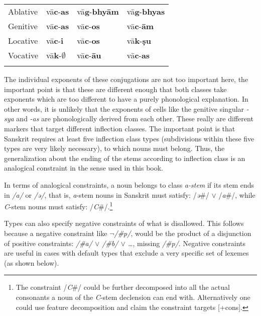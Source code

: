 \begin{table}
\begin{tabular}{llll}
      Ablative     & vā\textbf{c}-\textbf{as}          & vā\textbf{g}-\textbf{bhyām} & vā\textbf{g}-\textbf{bhyas} \\
      Genitive     & vā\textbf{c}-\textbf{as}          & vā\textbf{c}-\textbf{os}    & vā\textbf{c}-\textbf{ām}    \\
      Locative     & vā\textbf{c}-\textbf{i }          & vā\textbf{c}-\textbf{os}    & vā\textbf{k}-\textbf{ṣu}    \\
      Vocative     & vā\textbf{k}-$\emptyset$ & vā\textbf{c}-\textbf{āu}    & vā\textbf{c}-\textbf{as}    \\
      \lspbottomrule
    \end{tabular}
\end{table}

The individual exponents of these conjugations are not too important here, the important point is that these are different enough that both classes take exponents which are too different to have a purely phonological explanation. In other words, it is unlikely that the exponents of cells like the genitive singular \textit{-sya} and \textit{-as} are phonologically derived from each other. These really are different markers that target different inflection classes. The important point is that Sanskrit requires at least five inflection class types (subdivisions within these five types are very likely necessary), to which nouns must belong. Thus, the generalization about the ending of the stems according to inflection class is an analogical constraint in the sense used in this book.

In terms of analogical constraints, a noun belongs to class \textit{a-stem} if its stem ends in \textit{/a/} or \textit{/ə/}, that is, \textit{a}-stem nouns in Sanskrit must satisfy: /\textit{ə}\#/ $\lor$ /\textit{a}\#/, while \textit{C}-stem nouns must satisfy: /\textit{C}\#/.\footnote{The constraint /\textit{C}\#/ could be further decomposed into all the actual consonants a noun of the \textit{C}-stem declension can end with. Alternatively one could use feature decomposition and claim the constraint targets [+cons].}

Types can also specify negative constraints of what is disallowed. This follows because a negative constraint like \textit{$\lnot$/\#p/}, would be the product of a disjunction of positive constraints: \textit{/\#a/ $\lor$ /\#b/ $\lor$ \dots}, missing \textit{/\#p/}. Negative constraints are useful in cases with default types that exclude a very specific set of lexemes (as shown below). 

